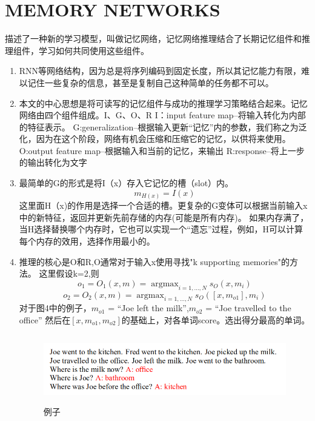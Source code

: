 \documentclass[a4paper,UTF8]{article}
\numberwithin{equation}{section}
\begin{document}
\section{MEMORY NETWORKS}
描述了一种新的学习模型，叫做记忆网络，记忆网络推理结合了长期记忆组件和推理组件，学习如何共同使用这些组件。
\begin{enumerate}
    \item RNN等网络结构，因为总是将序列编码到固定长度，所以其记忆能力有限，难以记住一些复杂的信息，甚至是复制自己这种简单的任务都不可以。
    \item 本文的中心思想是将可读写的记忆组件与成功的推理学习策略结合起来。记忆网络由四个组件组成。I、G、O、R    
        \subitem I：input feature map--将输入转化为内部的特征表示。
        \subitem G:generalization--根据输入更新“记忆”内的参数，我们称之为泛化，因为在这个阶段，网络有机会压缩和压缩它的记忆，以供将来使用。
        \subitem O:output feature map--根据输入和当前的记忆，来输出
        \subitem R:response--将上一步的输出转化为文字
    \item 最简单的G的形式是将I（x）存入它记忆的槽（slot）内。$$m_{H(x)}=I(x)$$这里面H（x)的作用是选择一个合适的槽。更复杂的G变体可以根据当前输入x中的新特征，返回并更新先前存储的内存(可能是所有内存)。
    如果内存满了，当H选择替换哪个内存时，它也可以实现一个“遗忘”过程，例如，H可以计算每个内存的效用，选择作用最小的。
    \item 推理的核心是O和R,O通常对于输入x使用寻找"k supporting memories"的方法。
    这里假设k=2,则
    $$ o_{1} = O_{1}(x,m)=\mathop{\arg \max}_{i=1,...,N}s_{O}(x,m_i) $$
    $$ o_{2}=O_{2}(x,m)=\mathop{\arg \max}_{i=1,...,N}s_{O}([x,m_{o1}],m_i)$$
    对于图4中的例子，$m_{o1}$ = “Joe left the milk”,$m_{o2}$ = “Joe travelled to the office”
    然后在$[x, m_{o1}, m_{o2}]$的基础上，对各单词score。选出得分最高的单词。
    \begin{figure}[H]
        \centering
        \includegraphics[height=3cm,width=13cm]{example1.png}
        \caption{例子}
    \end{figure}
\end{enumerate} 

\newpage
\end{document}
